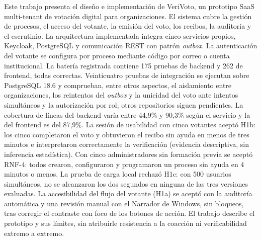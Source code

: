 \vspace{0.7cm}

Este trabajo presenta el diseño e implementación de VeriVoto, un prototipo
SaaS multi-tenant de votación digital para organizaciones. El sistema cubre la
gestión de procesos, el acceso del votante, la emisión del voto, los recibos,
la auditoría y el escrutinio. La arquitectura implementada integra cinco
servicios propios, Keycloak, PostgreSQL y comunicación REST con patrón
\emph{outbox}. La autenticación del votante se configura por proceso mediante
código por correo o cuenta institucional. La batería registrada contiene 175
pruebas de backend y 262 de frontend, todas correctas. Veinticuatro pruebas de
integración se ejecutan sobre PostgreSQL 18.6 y comprueban, entre otros
aspectos, el aislamiento entre organizaciones, los reintentos del
\emph{outbox} y la unicidad del voto ante intentos simultáneos y la
autorización por rol; otros repositorios siguen pendientes. La
cobertura de líneas del backend varía entre 44,9\% y 90,3\% según el servicio y la del frontend es del 87,9\%. La sesión de usabilidad con cinco votantes aceptó H1b:
los cinco completaron el voto y obtuvieron el recibo sin ayuda en menos de tres
minutos e interpretaron correctamente la verificación (evidencia descriptiva, sin
inferencia estadística). Con cinco administradores sin formación previa se
aceptó RNF-4: todos crearon, configuraron y programaron un proceso sin ayuda en
4 minutos o menos. La prueba de carga local rechazó H1c: con 500 usuarios
simultáneos, no se alcanzaron los dos segundos en ninguna de las tres
versiones evaluadas. La accesibilidad del flujo del votante (H1a) se aceptó con la
auditoría automática y una revisión manual con el Narrador de Windows, sin bloqueos,
tras corregir el contraste con foco de los botones de acción. El
trabajo describe el prototipo y sus límites, sin atribuirle resistencia a la
coacción ni verificabilidad extremo a extremo.

\vspace{0.7cm}

